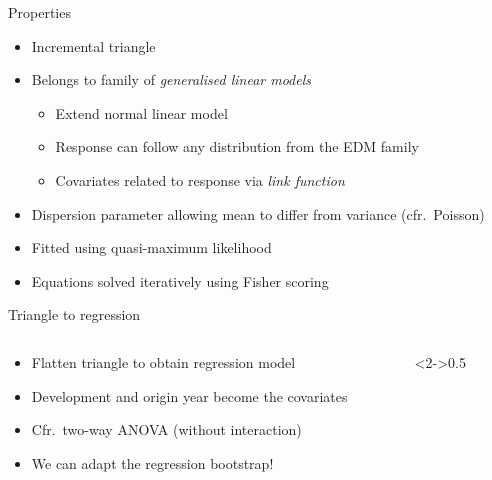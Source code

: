 \documentclass[tikz]{beamer}
\begin{document}
\begin{frame}{Properties}
  \begin{itemize}
    \item Incremental triangle
    \item Belongs to family of \emph{generalised linear models}
          \begin{itemize}
            \item Extend normal linear model
            \item Response can follow any distribution from the EDM family
            \item Covariates related to response via \emph{link function}
          \end{itemize}
    \item Dispersion parameter allowing mean to differ from variance (cfr.\ Poisson)
    \item Fitted using quasi-maximum likelihood
    \item Equations solved iteratively using Fisher scoring
  \end{itemize}
\end{frame}

\begin{frame}{Triangle to regression}
  \begin{columns}
    \begin{column}{0.5\linewidth}
      \begin{itemize}
        \item Flatten triangle to obtain regression model
        \item Development and origin year become the covariates
        \item Cfr.\ two-way ANOVA (without interaction)
        \item We can adapt the regression bootstrap!
      \end{itemize}
    \end{column}
    \begin{column}<2->{0.5\linewidth}
      \centering
    \end{column}
  \end{columns}
\end{frame}
\end{document}
